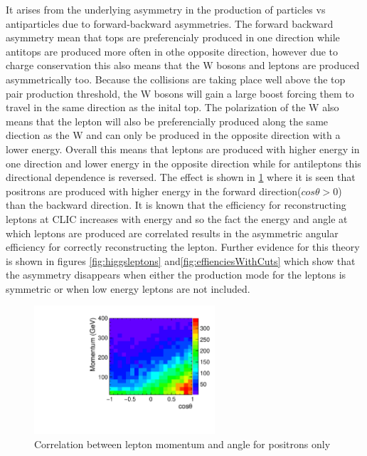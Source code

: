 It arises from the underlying asymmetry in the production of particles vs antiparticles due to forward-backward asymmetries. The forward backward asymmetry mean that tops are preferencialy produced in one direction while antitops are produced more often in othe opposite direction, however due to charge conservation this also means that the W bosons and leptons are produced asymmetrically too. Because the collisions are taking place well above the top pair production threshold, the W bosons will gain a large boost forcing them to travel in the same direction as the inital top. The polarization of the W also means that the lepton will also be preferencially produced along the same diection as the W and can only be produced in the opposite direction with a lower energy. Overall this means that leptons are produced with higher energy in one direction and lower energy in the opposite direction while for antileptons this directional dependence is reversed. The effect is shown in \ref{fig:efficiency2d} where it is seen that positrons are produced with higher energy in the forward direction($cos\theta>0$) than the backward direction. It is known that the efficiency for reconstructing leptons at CLIC increases with energy and so the fact the energy and angle at which leptons are produced are correlated results in the asymmetric angular efficiency for correctly reconstructing the lepton. Further evidence for this theory is shown in figures \ref{fig:higgsleptons} and\ref{fig:effienciesWithCuts} which show that the asymmetry disappears when either the production mode for the leptons is symmetric or when low energy leptons are not included.

\begin{figure}
  \centering
  \includegraphics[width=0.6\textwidth]{figures/MomentumVsTheta}
  \caption[Lepton Momentum Vs Angle]{Correlation between lepton momentum and angle for positrons only}
  \label{fig:efficiency2d}
\end{figure}

